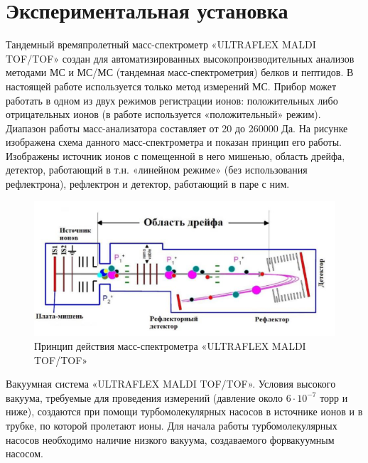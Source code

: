 \documentclass{article}
\begin{document}
\section{Экспериментальная установка}
Тандемный времяпролетный масс-спектрометр «ULTRAFLEX MALDI TOF/TOF» создан для автоматизированных высокопроизводительных анализов методами МС и МС/МС (тандемная масс-спектрометрия) белков и пептидов. В настоящей работе используется только метод измерений МС.
Прибор может работать в одном из двух режимов регистрации ионов: положительных либо отрицательных ионов (в работе используется «положительный» режим). Диапазон работы масс-анализатора составляет от 20 до 260000 Да. На рисунке изображена схема данного масс-спектрометра и показан принцип его работы. Изображены источник ионов с помещенной в него мишенью, область дрейфа, детектор, работающий в т.н. «линейном режиме» (без использования рефлектрона), рефлектрон и детектор, работающий в паре с ним.
\begin{figure}[h!]
        \centering
        \includegraphics[scale=0.7]{Images/Снимок экрана 2025-01-18 232036.png}
        \caption{ Принцип действия масс-спектрометра «ULTRAFLEX MALDI TOF/TOF»}
\end{figure}
Вакуумная система «ULTRAFLEX MALDI TOF/TOF». Условия высокого вакуума, требуемые для проведения измерений (давление около $6 \cdot 10^{-7}$ торр и ниже), создаются при помощи турбомолекулярных насосов в источнике ионов и в трубке, по которой пролетают ионы. Для начала работы турбомолекулярных насосов необходимо наличие низкого вакуума, создаваемого форвакуумным насосом.
\end{document}
